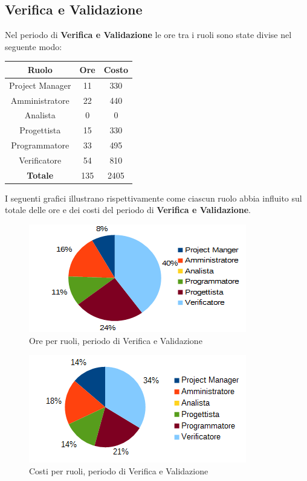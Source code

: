 	\subsection{Verifica e Validazione}
	Nel periodo di \textbf{Verifica e Validazione} le ore tra i ruoli sono state divise nel seguente modo: \\
	\begin{table}[H]
		\centering
		\begin{tabular}{|c|c|c|}
			\hline
			\textbf{Ruolo}		& \textbf{Ore}	& \textbf{Costo} \\
			\hline
			Project Manager		& 11			& 330	\\
			Amministratore		& 22			& 440	\\
			Analista			& 0				& 0	\\
			Progettista			& 15			& 330	\\
			Programmatore		& 33			& 495	\\
			Verificatore		& 54			& 810	\\
			\hline
			\textbf{Totale}		& 135			& 2405	\\
			\hline
		\end{tabular}
		\end{table}
	I seguenti grafici illustrano rispettivamente come ciascun ruolo abbia influito sul totale
delle ore e dei costi del periodo di \textbf{Verifica e Validazione}. \\
	\begin{figure}[H]
		\centering
		\includegraphics[width=1\linewidth]{immagini/grafici/validazione-torta.png}
		\caption{Ore per ruoli, periodo di Verifica e Validazione}
	\end{figure}
	\begin{figure}[H]
		\centering
		\includegraphics[width=1\linewidth]{immagini/grafici/validazione-torta-costo.png}
		\caption{Costi per ruoli, periodo di Verifica e Validazione}
	\end{figure}
